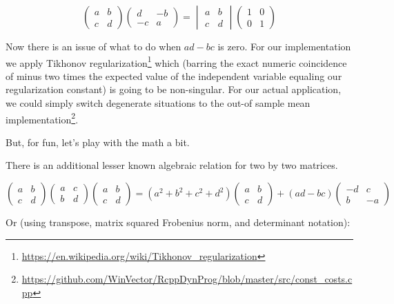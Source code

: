 \documentclass{article}
\begin{document}
\[ 
\begin{pmatrix} a & b \\ c & d \end{pmatrix}
\begin{pmatrix} d & -b \\ -c & a \end{pmatrix}
=
\begin{vmatrix} a & b \\ c & d \end{vmatrix}
\begin{pmatrix} 1 & 0 \\ 0 & 1 \end{pmatrix}
\]



Now there is an issue of what to do when $a d - b c$ is zero.  For our implementation we apply Tikhonov regularization\footnote{\url{https://en.wikipedia.org/wiki/Tikhonov_regularization}} which (barring the exact numeric coincidence of minus two times the expected value of the independent variable equaling our regularization constant) is going to be non-singular.  For our actual application, we could simply switch degenerate situations to the out-of sample mean implementation\footnote{\url{https://github.com/WinVector/RcppDynProg/blob/master/src/const_costs.cpp}}.

But, for fun, let's play with the math a bit.

There is an additional lesser known algebraic relation for two by two matrices.


\[ 
\begin{pmatrix} a & b \\ c & d \end{pmatrix}
\begin{pmatrix} a & c \\ b & d \end{pmatrix}
\begin{pmatrix} a & b \\ c & d \end{pmatrix}
=
(a^2 + b^2 + c^2 + d^2) 
\begin{pmatrix} a & b \\ c & d \end{pmatrix} 
+
(a d - b c)
\begin{pmatrix} -d & c \\ b & -a \end{pmatrix} 
\]

Or (using transpose, matrix squared Frobenius norm, and determinant notation):
\end{document}
